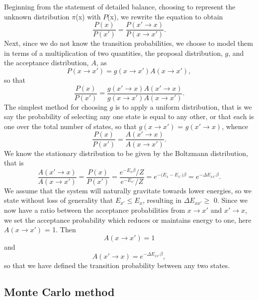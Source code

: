 \documentclass[11pt,a4paper]{article}
\begin{document}
Beginning from the statement of detailed balance, choosing to represent the unknown distribution $\pi$(x) with $P$(x), we rewrite the equation to obtain
\begin{equation}
\frac{P(x)}{P(x')} = \frac{P(x' \rightarrow x)}{P(x \rightarrow x')}.
\end{equation}
Next, since we do not know the transition probabilities, we choose to model them in terms of a multiplication of two quantities, the proposal distribution, $g$, and the acceptance distribution, $A$, as
\begin{equation}
P(x \rightarrow x') = g(x \rightarrow x')A(x \rightarrow x'),
\end{equation}
so that
\begin{equation}
\frac{P(x)}{P(x')} = \frac{g(x' \rightarrow x)A(x' \rightarrow x)}{g(x \rightarrow x')A(x \rightarrow x')}.
\end{equation}
The simplest method for choosing $g$ is to apply a uniform distribution, that is we say the probability of selecting any one state is equal to any other, or that each is one over the total number of states, so that $g(x \rightarrow x')$ = $g(x' \rightarrow x)$, whence
\begin{equation}
\frac{P(x)}{P(x')} = \frac{A(x' \rightarrow x)}{A(x \rightarrow x')}.
\end{equation}
We know the stationary distribution to be given by the Boltzmann distribution, that is 
\begin{equation}
\frac{A(x' \rightarrow x)}{A(x \rightarrow x')} = \frac{P(x)}{P(x')} = \frac{e^{-E_x\beta}/Z}{e^{-E_{x'}}/Z} = e^{-\big(E_x - E_{x'}\big)\beta} = e^{-\Delta E_{xx'}\beta}.
\end{equation}
We assume that the system will naturally gravitate towards lower energies, so we state without loss of generality that $E_{x'} \leq E_x$, resulting in $\Delta E_{xx'} \geq$ 0. Since we now have a ratio between the acceptance probabilities from $x \rightarrow x'$ and $x' \rightarrow x$, we set the acceptance probability which reduces or maintains energy to one, here $A(x \rightarrow x')$ = 1. Then
\begin{equation}
A(x \rightarrow x') = 1
\end{equation}
and
\begin{equation}
A(x' \rightarrow x) = e^{-\Delta E_{xx'}\beta},
\end{equation}
so that we have defined the transition probability between any two states. 

\subsection{Monte Carlo method}
\end{document}
